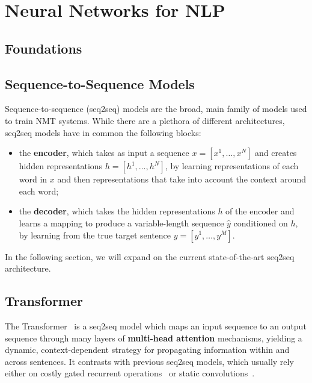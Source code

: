 \section{Neural Networks for NLP}
\label{sec:nmt}

\subsection{Foundations}

\subsection{Sequence-to-Sequence Models}
\label{sec:transformer_bg}

Sequence-to-sequence (seq2seq) models are the broad, main family of models
used to train NMT systems. While there are a plethora of different architectures,
seq2seq models have in common the following blocks:

\begin{itemize}
  \item the {\bf encoder}, which takes as input a sequence $x=[x^1,
          \dots, x^N]$ and creates hidden representations $h=[h^1, \dots,
          h^N]$, by learning representations of each word in $x$ and then
        representations that take into account the context around each word;
  \item the {\bf decoder}, which takes the hidden representations
        $h$ of the encoder and learns a mapping to produce a
        variable-length sequence $\hat{y}$ conditioned on $h$, by
        learning from the true target sentence $y=[y^1, \dots, y^M]$.
\end{itemize}

In the following section, we will expand on the current
state-of-the-art seq2seq architecture.

\subsection{Transformer}

The Transformer~\citep{vaswani2017attention} is a seq2seq model which
maps an input sequence to an output sequence through many layers of
\textbf{multi-head attention} mechanisms, yielding a dynamic,
context-dependent strategy for propagating information within and
across sentences. It contrasts with previous seq2seq models, which
usually rely either on costly gated recurrent operations~\citep[often
  LSTMs:][]{bahdanau2014neural,luong2015effective} or static
convolutions~\citep{convseq}.

